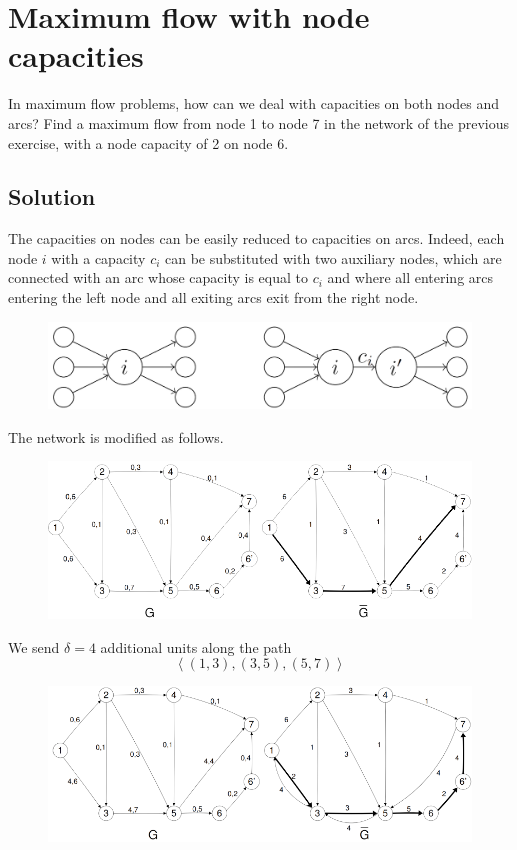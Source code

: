 \documentclass[12pt, a4paper]{report}
\newtheorem[style=M,bodystyle=\normalfont]{theorem}{Theorem}
\newtheorem[style=M,bodystyle=\normalfont]{corollary}{Corollary}
\newtheorem[style=M,bodystyle=\normalfont]{lemma}{Lemma}
\newtheorem[style=M,bodystyle=\normalfont]{definition}{Definition}
\begin{document}
    \newpage

    \section{Maximum flow with node capacities}
        In maximum flow problems, how can we deal with capacities on both nodes and arcs? Find a maximum flow from node 1 to node 7 in the network of the previous exercise, 
        with a node capacity of 2 on node 6.
    \subsection*{Solution}
        The capacities on nodes can be easily reduced to capacities on arcs. Indeed, each node $i$ with a capacity $c_i$ can be substituted with two auxiliary nodes, 
        which are connected with an arc whose capacity is equal to $c_i$ and where all entering arcs entering the left node and all exiting arcs exit from the right node.
        \begin{figure}[H]
            \centering
            \includegraphics[width=0.5\linewidth]{images/max.png}
        \end{figure}
        The network is modified as follows. 
        \begin{figure}[H]
            \centering
            \includegraphics[width=0.9\linewidth]{images/max1.png}
        \end{figure}
        We send $\delta=4$ additional units along the path \[\left\langle (1, 3),(3, 5),(5, 7) \right\rangle\]
        \begin{figure}[H]
            \centering
            \includegraphics[width=0.9\linewidth]{images/max2.png}
        \end{figure}
\end{document}
